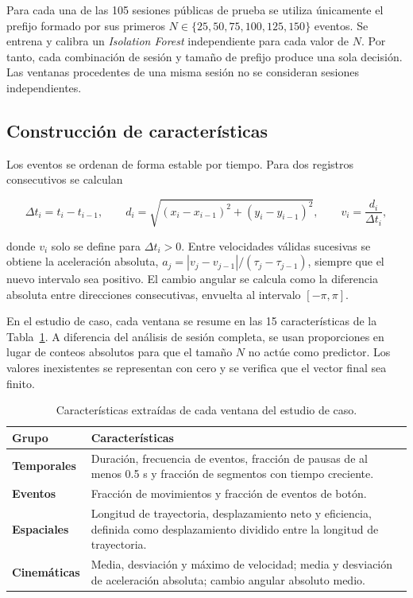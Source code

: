 \documentclass[11pt,letterpaper]{article}
\begin{document}
Para cada una de las 105 sesiones públicas de prueba se utiliza únicamente el prefijo formado por sus primeros
$N\in\{25,50,75,100,125,150\}$ eventos. Se entrena y calibra un \emph{Isolation Forest} independiente para cada
valor de $N$. Por tanto, cada combinación de sesión y tamaño de prefijo produce una sola decisión. Las ventanas
procedentes de una misma sesión no se consideran sesiones independientes.

\subsection{Construcción de características}

Los eventos se ordenan de forma estable por tiempo. Para dos registros consecutivos se calculan

\begin{equation}
  \Delta t_i=t_i-t_{i-1}, \qquad
  d_i=\sqrt{(x_i-x_{i-1})^2+(y_i-y_{i-1})^2}, \qquad
  v_i=\frac{d_i}{\Delta t_i},
\end{equation}

donde $v_i$ solo se define para $\Delta t_i>0$. Entre velocidades válidas sucesivas se obtiene la aceleración
absoluta,
$a_j=|v_j-v_{j-1}|/(\tau_j-\tau_{j-1})$, siempre que el nuevo intervalo sea positivo. El cambio angular se calcula
como la diferencia absoluta entre direcciones consecutivas, envuelta al intervalo $[-\pi,\pi]$.

En el estudio de caso, cada ventana se resume en las 15 características de la Tabla~\ref{tab:caracteristicas}. A
diferencia del análisis de sesión completa, se usan proporciones en lugar de conteos absolutos para que el tamaño $N$
no actúe como predictor. Los valores inexistentes se representan con cero y se verifica que el vector final sea
finito.

\begin{table}[htbp]
  \centering

  \small
  \begin{tabularx}{\textwidth}{>{\bfseries}p{2.7cm}X}
    \toprule
    Grupo & Características \\
    \midrule
    Temporales & Duración, frecuencia de eventos, fracción de pausas de al menos 0.5 s y fracción de segmentos
    con tiempo creciente. \\
    Eventos & Fracción de movimientos y fracción de eventos de botón. \\
    Espaciales & Longitud de trayectoria, desplazamiento neto y eficiencia, definida como desplazamiento dividido
    entre la longitud de trayectoria. \\
    Cinemáticas & Media, desviación y máximo de velocidad; media y desviación de aceleración absoluta; cambio
    angular absoluto medio. \\
    \bottomrule
  \end{tabularx}
  \caption{Características extraídas de cada ventana del estudio de caso.}
  \label{tab:caracteristicas}
\end{table}
\end{document}
